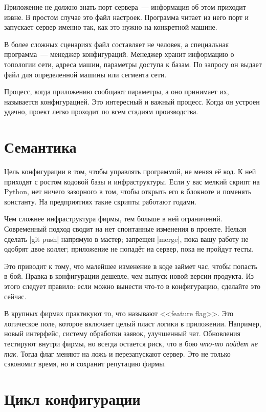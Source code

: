 Приложение не должно знать порт сервера~--- информация об этом приходит извне. В
простом случае это файл настроек. Программа читает из него порт и запускает
сервер именно так, как это нужно на конкретной машине.


В более сложных сценариях файл составляет не человек, а специальная
программа~--- менеджер конфигураций. Менеджер хранит информацию о топологии
сети, адреса машин, параметры доступа к базам. По запросу он выдает файл для
определенной машины или сегмента сети.

Процесс, когда приложению сообщают параметры, а оно принимает их, называется
конфигурацией. Это интересный и важный процесс. Когда он устроен удачно, проект
легко проходит по всем стадиям производства.

\section{Семантика}

Цель конфигурации в том, чтобы управлять программой, не меняя е\"{е} код. К ней
приходят с ростом кодовой базы и инфраструктуры. Если у вас мелкий скрипт на
Python, нет ничего зазорного в том, чтобы открыть его в блокноте и поменять
константу. На предприятиях такие скрипты работают годами.

Чем сложнее инфраструктура фирмы, тем больше в ней ограничений. Современный
подход сводит на нет спонтанные изменения в проекте. Нельзя сделать \spverb|git push|
напрямую в мастер; запрещен \spverb|merge|, пока вашу работу не одобрят
двое коллег; приложение не попад\"{е}т на сервер, пока не пройдут тесты.

Это приводит к тому, что малейшее изменение в коде займет час, чтобы попасть в
бой. Правка в конфигурации дешевле, чем выпуск новой версии продукта. Из этого
следует правило: если можно вынести что-то в конфигурацию, сделайте это сейчас.


В крупных фирмах практикуют то, что называют <<feature flag>>. Это логическое
поле, которое включает целый пласт логики в приложении. Например, новый
интерфейс, систему обработки заявок, улучшенный чат. Обновления тестируют внутри
фирмы, но всегда остается риск, что в бою \emph{что-то пойдет не так}. Тогда
флаг меняют на ложь и перезапускают сервер. Это не только сэкономит время, но и
сохранит репутацию фирмы.

\section{Цикл конфигурации}

